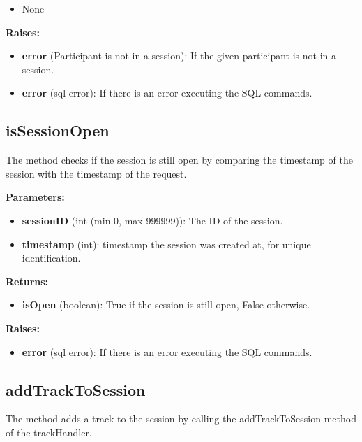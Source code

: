 \documentclass[oneside, nenglish]{sdqtechreport}
\begin{document}
\begin{itemize}
\begin{itemize}
    \item None
\end{itemize}

\textbf{Raises:}

\begin{itemize}
    \item \textbf{error} (Participant is not in a session): If the given participant is not in a session.
    \item \textbf{error} (sql error): If there is an error executing the SQL commands.
\end{itemize}


\subsection{isSessionOpen}

The method checks if the session is still open by comparing the timestamp of the session with the timestamp of the request.

\textbf{Parameters:}

\begin{itemize}
    \item \textbf{sessionID} (int (min 0, max 999999)): The ID of the session.
    \item \textbf{timestamp} (int): timestamp the session was created at, for unique identification.
\end{itemize}

\textbf{Returns:}

\begin{itemize}
    \item \textbf{isOpen} (boolean): True if the session is still open, False otherwise.
\end{itemize}

\textbf{Raises:}

\begin{itemize}
    \item \textbf{error} (sql error): If there is an error executing the SQL commands.
\end{itemize}


\subsection{addTrackToSession}

The method adds a track to the session by calling the addTrackToSession method of the trackHandler.


\end{itemize}
\end{document}
